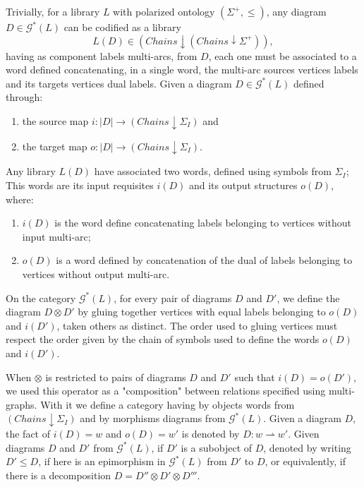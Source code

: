 \documentclass[oribibl]{llncs}
\newcommand{\G}{\mathcal{G}}
\begin{document}
Trivially, for a library $L$ with polarized ontology
$(\Sigma^+,\leq)$, any diagram $D\in \G^\ast(L)$ can be
codified as a library \[L(D)\in (Chains\downarrow(Chains\downarrow
\Sigma^+)),\]
having as component labels multi-arcs, from $D$, each one must be associated to a word defined concatenating, in a single word, the multi-arc sources vertices labels and its targets vertices dual labels. Given a diagram $D\in \G^\ast(L)$ defined through:
\begin{enumerate}
  \item the source map $i:|D|\rightarrow (Chains\downarrow \Sigma_I)$ and
  \item the target map $o:|D|\rightarrow (Chains\downarrow \Sigma_I)$.
\end{enumerate}
Any library $L(D)$ have associated two words, defined using symbols from  $\Sigma_I$; This words are its
input requisites $i(D)$ and its output structures $o(D)$, where:
\begin{enumerate}
  \item $i(D)$ is the word define concatenating labels belonging to vertices without input multi-arc;
  \item $o(D)$ is a word defined by concatenation of the dual of labels belonging to vertices without output multi-arc.
\end{enumerate}

On the category $\G^\ast(L)$, for every pair of diagrams
$D$ and $D'$, we define the diagram $D\otimes D'$ by gluing
together vertices with equal labels belonging to $o(D)$ and $i(D')$, taken others as distinct. The order used to gluing vertices must respect the order given by the chain of symbols used to define the words $o(D)$ and $i(D')$.

When $\otimes$  is restricted to pairs of diagrams $D$ and $D'$
such that $i(D)=o(D')$, we used this operator as a "composition"
between relations specified using multi-graphs. With it we define a
category having by objects words from $(Chains \downarrow \Sigma_I)$
and by morphisms diagrams from $\G^\ast(L)$. Given a
diagram $D$, the fact of $i(D)=w$ and $o(D)=w'$ is denoted by
$D:w\rightharpoonup w'$. Given diagrams $D$ and
$D'$ from $\G^\ast(L)$, if $D'$ is a subobject of $D$, denoted by writing $D'\leq D$, if here is an epimorphism in $\G^\ast(L)$ from $D'$ to $D$, or equivalently, if there is a decomposition $D=D''\otimes D' \otimes D'''$.
\end{document}
